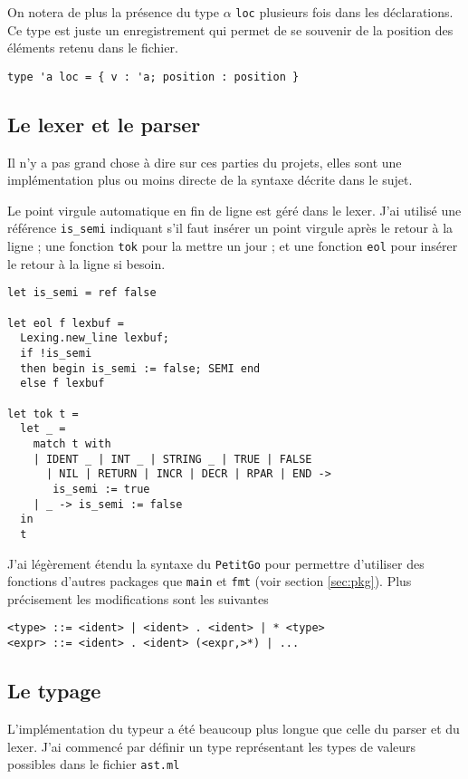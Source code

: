 \documentclass{article}
\begin{document}
On notera de plus la présence du type $\alpha$ \texttt{loc} plusieurs fois dans les déclarations. Ce type est juste un enregistrement qui permet de se souvenir de la position des éléments retenu dans le fichier.

\begin{verbatim}
type 'a loc = { v : 'a; position : position }
\end{verbatim}

\subsection{Le lexer et le parser}

Il n'y a pas grand chose à dire sur ces parties du projets, elles sont une implémentation plus ou moins directe de la syntaxe décrite dans le sujet.

Le point virgule automatique en fin de ligne est géré dans le lexer. J'ai utilisé une référence \texttt{is\_semi} indiquant s'il faut insérer un point virgule après le retour à la ligne ; une fonction \texttt{tok} pour la mettre un jour ; et une fonction \texttt{eol} pour insérer le retour à la ligne si besoin.

\begin{verbatim}
let is_semi = ref false

let eol f lexbuf =
  Lexing.new_line lexbuf;
  if !is_semi
  then begin is_semi := false; SEMI end
  else f lexbuf

let tok t =
  let _ =
    match t with
    | IDENT _ | INT _ | STRING _ | TRUE | FALSE
      | NIL | RETURN | INCR | DECR | RPAR | END ->
       is_semi := true
    | _ -> is_semi := false
  in
  t

\end{verbatim}

J'ai légèrement étendu la syntaxe du \texttt{PetitGo} pour permettre d'utiliser des fonctions d'autres packages que \texttt{main} et \texttt{fmt} (voir section \ref{sec:pkg}). Plus précisement les modifications sont les suivantes

\begin{verbatim}
<type> ::= <ident> | <ident> . <ident> | * <type>
<expr> ::= <ident> . <ident> (<expr,>*) | ...
\end{verbatim}

\subsection{Le typage}

L'implémentation du typeur a été beaucoup plus longue que celle du parser et du lexer. J'ai commencé par définir un type représentant les types de valeurs possibles dans le fichier \texttt{ast.ml}
\end{document}
